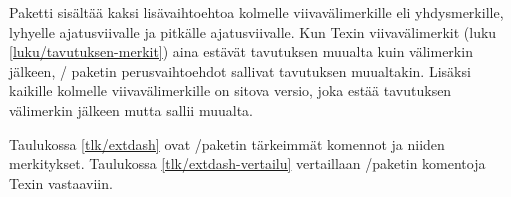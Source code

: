 \begin{koodilohkosis}
\usepackage[shortcuts]{extdash}
\end{koodilohkosis}

\noindent
Paketti sisältää kaksi lisävaihtoehtoa kolmelle viivavälimerkille eli
yhdysmerkille, lyhyelle ajatusviivalle ja pitkälle ajatusviivalle. Kun
Texin viivavälimerkit (luku \ref{luku/tavutuksen-merkit}) aina estävät
tavutuksen muualta kuin välimerkin jälkeen, \-/ paketin
perusvaihtoehdot sallivat tavutuksen muualtakin. Lisäksi kaikille
kolmelle viivavälimerkille on sitova versio, joka estää tavutuksen
välimerkin jälkeen mutta sallii muualta.

Taulukossa \ref{tlk/extdash} ovat \-/paketin tärkeimmät
komennot ja niiden merkitykset. Taulukossa \ref{tlk/extdash-vertailu}
vertaillaan \-/paketin komentoja Texin vastaaviin.


